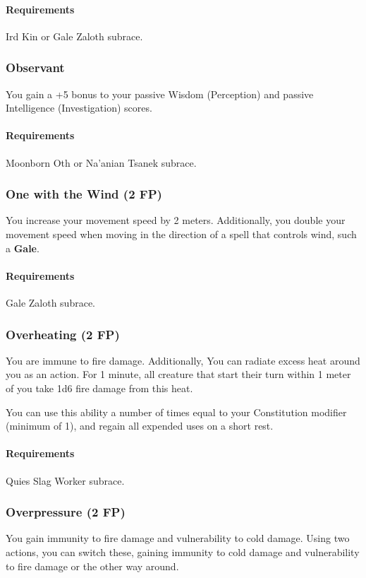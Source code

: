     \paragraph{Requirements} Ird Kin or Gale Zaloth subrace.
\subsubsection{Observant} \label{feat::observant}
    You gain a +5 bonus to your passive Wisdom (Perception) and passive Intelligence (Investigation) scores.
    \paragraph{Requirements} Moonborn Oth or Na'anian Tsanek subrace.
\subsubsection{One with the Wind (2 FP)} \label{feat::onewiththewind}
    You increase your movement speed by 2 meters.
    Additionally, you double your movement speed when moving in the direction of a spell that controls wind, such a \textbf{Gale}.
    \paragraph{Requirements} Gale Zaloth subrace.
\subsubsection{Overheating (2 FP)} \label{feat::overheating}
    You are immune to fire damage.
    Additionally, You can radiate excess heat around you as an action.
    For 1 minute, all creature that start their turn within 1 meter of you take 1d6 fire damage from this heat.

    You can use this ability a number of times equal to your Constitution modifier (minimum of 1), and regain all expended uses on a short rest.
    \paragraph{Requirements} Quies Slag Worker subrace.
\subsubsection{Overpressure (2 FP)} \label{feat::overpressure}
    You gain immunity to fire damage and vulnerability to cold damage.
    Using two actions, you can switch these, gaining immunity to cold damage and vulnerability to fire damage or the other way around.
